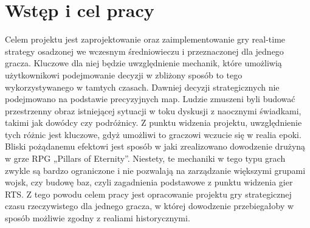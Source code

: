 \chapter{Wstęp i cel pracy}\label{chap:introduction}

Celem projektu jest zaprojektowanie oraz zaimplementowanie gry real-time strategy osadzonej we wczesnym średniowieczu i przeznaczonej dla jednego gracza. Kluczowe dla niej będzie uwzględnienie mechanik, które umożliwią użytkownikowi podejmowanie decyzji w zbliżony sposób to tego wykorzystywanego w tamtych czasach. Dawniej decyzji strategicznych nie podejmowano na podstawie precyzyjnych map. Ludzie zmuszeni byli  budować  przestrzenny obraz istniejącej sytuacji  w toku dyskusji z naocznymi świadkami, takimi jak dowódcy czy podróżnicy. Z punktu widzenia projektu, uwzględnienie tych różnic jest kluczowe, gdyż umożliwi to graczowi wczucie się w realia epoki. Bliski pożądanemu efektowi jest sposób w jaki zrealizowano dowodzenie drużyną w grze RPG „Pillars of Eternity”. Niestety, te mechaniki w tego typu grach zwykle są bardzo ograniczone i nie pozwalają na zarządzanie większymi grupami wojsk, czy budowę baz, czyli zagadnienia podstawowe z punktu widzenia gier RTS. Z tego powodu celem pracy jest opracowanie projektu gry strategicznej czasu rzeczywistego dla jednego gracza, w której dowodzenie przebiegałoby w sposób możliwie zgodny z realiami historycznymi.